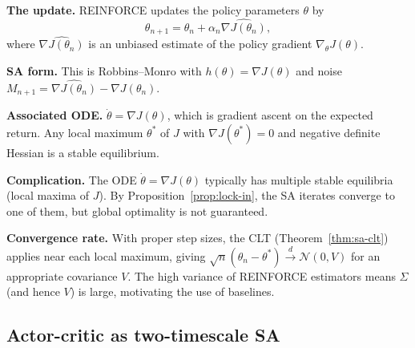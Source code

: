 \documentclass[11pt,a4paper]{article}
\theoremstyle{definition}
\theoremstyle{plain}
\theoremstyle{remark}
\newcommand{\cdist}{\xrightarrow{d}}
\begin{document}
\begin{rlconnection}
\textbf{The update.} REINFORCE updates the policy parameters $\theta$ by
\[
  \theta_{n+1} = \theta_n + \alpha_n \widehat{\nabla J(\theta_n)},
\]
where $\widehat{\nabla J(\theta_n)}$ is an unbiased estimate of the policy gradient
$\nabla_\theta J(\theta)$.

\textbf{SA form.} This is Robbins--Monro with $h(\theta) = \nabla J(\theta)$ and
noise $M_{n+1} = \widehat{\nabla J(\theta_n)} - \nabla J(\theta_n)$.

\textbf{Associated ODE.} $\dot{\theta} = \nabla J(\theta)$, which is gradient
ascent on the expected return. Any local maximum $\theta^*$ of $J$ with
$\nabla J(\theta^*) = 0$ and negative definite Hessian is a stable equilibrium.

\textbf{Complication.} The ODE $\dot{\theta} = \nabla J(\theta)$ typically has
multiple stable equilibria (local maxima of $J$). By Proposition~\ref{prop:lock-in},
the SA iterates converge to one of them, but global optimality is not guaranteed.

\textbf{Convergence rate.} With proper step sizes, the CLT
(Theorem~\ref{thm:sa-clt}) applies near each local maximum, giving
$\sqrt{n}(\theta_n - \theta^*) \cdist \mathcal{N}(0, V)$ for an appropriate
covariance $V$. The high variance of REINFORCE estimators means $\Sigma$ (and hence
$V$) is large, motivating the use of baselines.
\end{rlconnection}

\subsection{Actor-critic as two-timescale SA}
\end{document}
